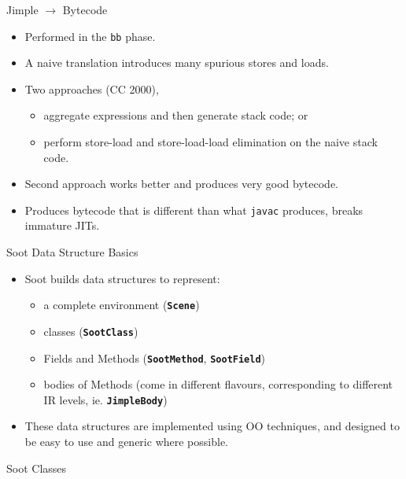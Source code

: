 \begin{slide} {Jimple $\rightarrow$ Bytecode}
\vspace{-0.3in}
\begin{itemize}
\item Performed in the \texttt{bb} phase.
\item A naive translation introduces many spurious stores and loads.
\item Two approaches (CC 2000),  
\begin{itemize}
\item aggregate expressions and then generate stack
      code; or 
\item perform store-load and store-load-load elimination 
      on the naive stack code. 
\end{itemize}
\item Second approach works better and produces very good bytecode.
\item Produces bytecode that is different than what {\tt javac} 
produces,  breaks immature JITs.
\end{itemize}
\end{slide}

\begin{slide}{Soot Data Structure Basics}
\begin{itemize}
\item
Soot builds data structures to represent: 
\begin{itemize}
\item a complete environment (\textbf{\texttt{Scene}}) 
\item classes (\textbf{\texttt{SootClass}}) 
\item Fields and Methods (\textbf{\texttt{SootMethod}}, \textbf{\texttt{SootField}})
\item bodies of Methods (come in different flavours, corresponding to 
         different IR levels, ie. \textbf{\texttt{JimpleBody}})
\end{itemize}
\item
These data structures are implemented using OO techniques, and designed 
to be easy to use and generic where possible.  
\end{itemize}
\end{slide}

\begin{slide}{Soot Classes}
\vspace*{-0.1in}
\begin{center}

\end{center}
\end{slide}

